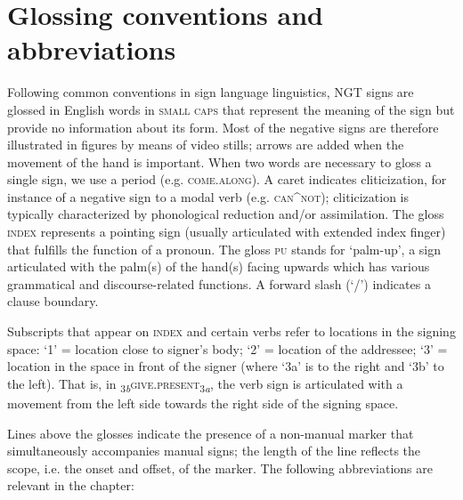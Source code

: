 \documentclass[output=paper,colorlinks,citecolor=brown]{langscibook}
\begin{document}
\section*{Glossing conventions and abbreviations} \label{sec:ngt:gloss}
\largerpage
Following common conventions in sign language linguistics, NGT signs are gloss\-ed in English words in \textsc{small caps} that represent the meaning of the sign but provide no information about its form. Most of the negative signs are therefore illustrated in figures by means of video stills; arrows are added when the movement of the hand is important. When two words are necessary to gloss a single sign, we use a period (e.g. \textsc{come.along}). A caret indicates cliticization, for instance of a negative sign to a modal verb (e.g. \textsc{can}\^{}\textsc{not}); cliticization is typically characterized by phonological reduction and/or assimilation. The gloss \textsc{index} represents a pointing sign (usually articulated with extended index finger) that fulfills the function of a pronoun. The gloss \textsc{pu} stands for `palm-up', a sign articulated with the palm(s) of the hand(s) facing upwards which has various grammatical and discourse-related functions. A forward slash (`/') indicates a clause boundary.

Subscripts that appear on \textsc{index} and certain verbs refer to locations in the signing space: `1' = location close to signer’s body; `2' = location of the addressee; `3' = location in the space in front of the signer (where `3a' is to the right and `3b' to the left). That is, in \textsubscript{3\textit{b}}\textsc{give.present}\textsubscript{3\textit{a}}, the verb sign is articulated with a movement from the left side towards the right side of the signing space.

Lines above the glosses indicate the presence of a non-manual marker that simultaneously accompanies manual signs; the length of the line reflects the scope, i.e. the onset and offset, of the marker. The following abbreviations are relevant in the chapter:\medskip
\end{document}
